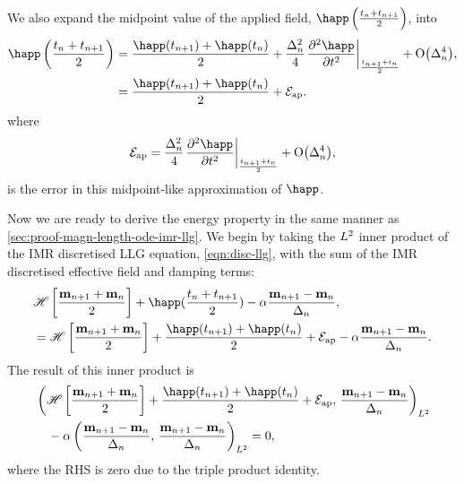 We also expand the midpoint value of the applied field, $\mphapp$, into
\begin{equation}
  \begin{aligned}
    \mphapp &= \frac{\happ(t_{n+1}) + \happ(t_n)}{2}
    + \frac{\dtn^2}{4} \evalatb{\spd{\happ}{t}}{\frac{t_{n+1} + t_n}{2}}  + \order{\dtn^4}, \\
    &= \frac{\happ(t_{n+1}) + \happ(t_n)}{2} + \happerror.\\
    \label{eq:happ-midpoint}
  \end{aligned}
\end{equation}
where
\begin{equation}
  \happerror = \frac{\dtn^2}{4} \evalatb{\spd{\happ}{t}}{\frac{t_{n+1} + t_n}{2}}  + \order{\dtn^4},
\end{equation}
is the error in this midpoint-like approximation of $\happ$.

Now we are ready to derive the energy property in the same manner as \cref{sec:proof-magn-length-ode-imr-llg}.
We begin by taking the $L^2$ inner product of the IMR discretised LLG equation, \cref{eqn:disc-llg}, with the sum of the IMR discretised effective field and damping terms:
\begin{equation}
  \begin{aligned}
    & \mphop + \happ(\mpt) - \dampc \mpdmdt, \\
    &= \mphop + \frac{\happ(t_{n+1}) + \happ(t_n)}{2} + \happerror - \dampc \mpdmdt.
  \end{aligned}
\end{equation}
The result of this inner product is
\begin{equation}
  \begin{aligned}
    &\ltip{\mphop + \frac{\happ(t_{n+1}) + \happ(t_n)}{2} + \happerror}{\mpdmdt} \\
    & \quad - \dampc \ltip{\mpdmdt}{\mpdmdt} = 0,
    \label{eq:54}
  \end{aligned}
\end{equation}
where the RHS is zero due to the triple product identity.

